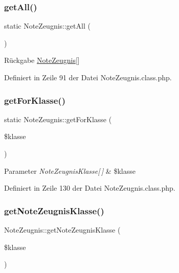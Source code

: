 \subsubsection{\texorpdfstring{get\+All()}{getAll()}}
{\footnotesize\ttfamily static Note\+Zeugnis\+::get\+All (\begin{DoxyParamCaption}{ }\end{DoxyParamCaption})\hspace{0.3cm}{\ttfamily [static]}}

\begin{DoxyReturn}{Rückgabe}
\mbox{\hyperlink{class_note_zeugnis}{Note\+Zeugnis}}\mbox{[}\mbox{]} 
\end{DoxyReturn}


Definiert in Zeile 91 der Datei Note\+Zeugnis.\+class.\+php.

\mbox{\label{class_note_zeugnis_adb57787364e9be6143b59674a0cac12d}} 
\subsubsection{\texorpdfstring{get\+For\+Klasse()}{getForKlasse()}}
{\footnotesize\ttfamily static Note\+Zeugnis\+::get\+For\+Klasse (\begin{DoxyParamCaption}\item[{}]{\$klasse }\end{DoxyParamCaption})\hspace{0.3cm}{\ttfamily [static]}}


\begin{DoxyParams}{Parameter}
{\em Note\+Zeugnis\+Klasse\mbox{[}$\,$\mbox{]}} & \$klasse \\
\hline
\end{DoxyParams}


Definiert in Zeile 130 der Datei Note\+Zeugnis.\+class.\+php.

\mbox{\label{class_note_zeugnis_a6d02250befec2fa882cd4c637e25653b}} 
\subsubsection{\texorpdfstring{get\+Note\+Zeugnis\+Klasse()}{getNoteZeugnisKlasse()}}
{\footnotesize\ttfamily Note\+Zeugnis\+::get\+Note\+Zeugnis\+Klasse (\begin{DoxyParamCaption}\item[{}]{\$klasse }\end{DoxyParamCaption})}


